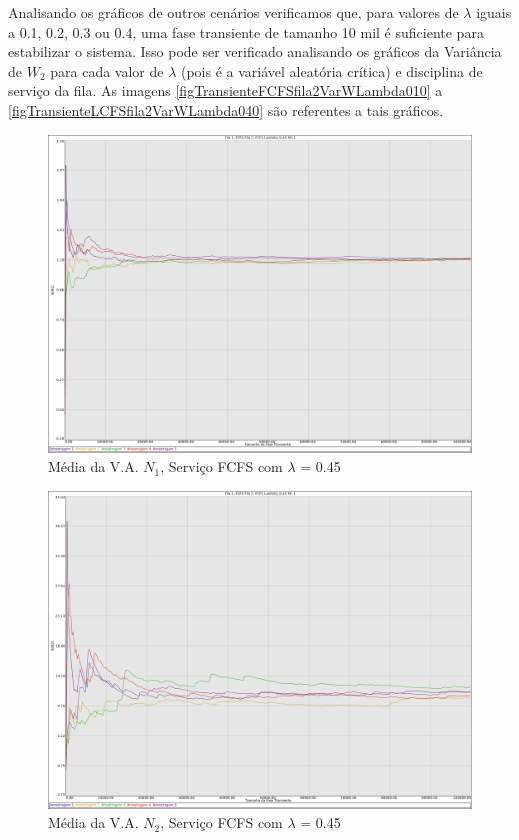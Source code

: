 \documentclass[a4paper,10pt]{article}
\begin{document}
    Analisando os gráficos de outros cenários verificamos que, para valores de $\lambda$ iguais a 0.1, 0.2, 0.3 ou 0.4, uma fase transiente de tamanho 10 mil é suficiente para estabilizar o sistema. Isso pode ser verificado analisando os gráficos da Variância de $W_2$ para cada valor de $\lambda$ (pois é a variável aleatória crítica) e disciplina de serviço da fila. As imagens \ref{figTransienteFCFSfila2VarWLambda010} a \ref{figTransienteLCFSfila2VarWLambda040} são referentes a tais gráficos.

\pagebreak

\begin{figure}
	\caption{Média da V.A. $N_1$, Serviço FCFS com $\lambda$ = 0.45}
	\label{figTransienteFCFSfila1N}
	\includegraphics[scale = 0.20]{./graficos_transiente_1/FCFS/01.png}
\end{figure}

\begin{figure}
	\caption{Média da V.A. $N_2$, Serviço FCFS com $\lambda$ = 0.45}
	\label{figTransienteFCFSfila2N}
	\includegraphics[scale = 0.20]{./graficos_transiente_1/FCFS/02.png}
\end{figure}
\end{document}
